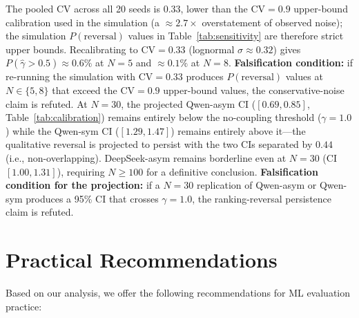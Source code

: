 \documentclass[11pt]{article}
\begin{document}
The pooled CV across all 20 seeds is 0.33, lower than the CV$=0.9$ upper-bound calibration used in the simulation (a $\approx 2.7\times$ overstatement of observed noise); the simulation $P(\text{reversal})$ values in Table~\ref{tab:sensitivity} are therefore strict upper bounds. Recalibrating to CV$=0.33$ (lognormal $\sigma \approx 0.32$) gives $P(\hat{\gamma} > 0.5) \approx 0.6\%$ at $N{=}5$ and $\approx 0.1\%$ at $N{=}8$. \textbf{Falsification condition:} if re-running the simulation with $\text{CV}{=}0.33$ produces $P(\text{reversal})$ values at $N \in \{5, 8\}$ that exceed the CV$=0.9$ upper-bound values, the conservative-noise claim is refuted. At $N{=}30$, the projected Qwen-asym CI ($[0.69, 0.85]$, Table~\ref{tab:calibration}) remains entirely below the no-coupling threshold ($\gamma{=}1.0$) while the Qwen-sym CI ($[1.29, 1.47]$) remains entirely above it---the qualitative reversal is projected to persist with the two CIs separated by $0.44$ (i.e., non-overlapping). DeepSeek-asym remains borderline even at $N{=}30$ (CI $[1.00, 1.31]$), requiring $N \geq 100$ for a definitive conclusion. \textbf{Falsification condition for the projection:} if a $N{=}30$ replication of Qwen-asym or Qwen-sym produces a 95\% CI that crosses $\gamma{=}1.0$, the ranking-reversal persistence claim is refuted.

\section{Practical Recommendations}
\label{sec:recommendations}

Based on our analysis, we offer the following recommendations for ML evaluation practice:
\end{document}
